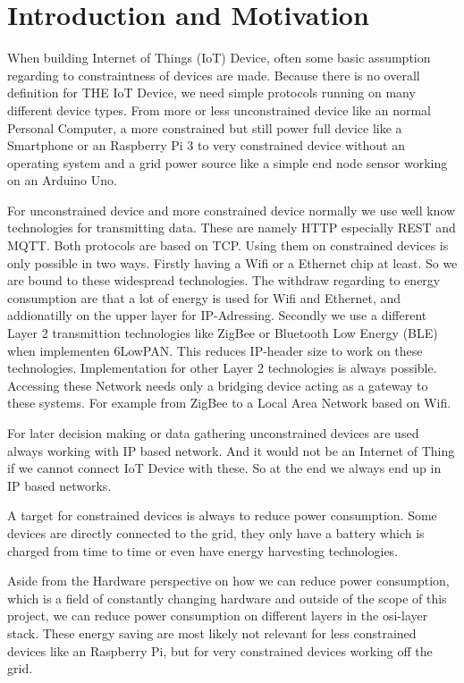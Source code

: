 \section{Introduction and Motivation}\label{sec:ein}
When building Internet of Things (IoT) Device, often some basic assumption regarding to constraintness of devices are made.
Because there is no overall definition for THE IoT Device, we need simple protocols running on many different device types.
From more or less unconstrained device like an normal Personal Computer, a more constrained but still power full device like a Smartphone or an Raspberry Pi 3 to very constrained device without an operating system and a grid power source like a simple end node sensor working on an Arduino Uno.

For unconstrained device and more constrained device normally we use well know technologies for transmitting data.
These are namely HTTP especially REST and MQTT.
Both protocols are based on TCP.
Using them on constrained devices is only possible in two ways.
Firstly having a Wifi or a Ethernet chip at least. So we are bound to these widespread technologies.
The withdraw regarding to energy consumption are that a lot of energy is used for Wifi and Ethernet, and addionatilly on the upper layer for IP-Adressing.
Secondly we use a different Layer 2 transmittion technologies like ZigBee or Bluetooth Low Energy (BLE) when implementen 6LowPAN.
This reduces IP-header size to work on these technologies.
Implementation for other Layer 2 technologies is always possible.
Accessing these Network needs only a bridging device acting as a gateway to these systems. For example from ZigBee to a Local Area Network based on Wifi.

For later decision making or data gathering unconstrained devices are used always working with IP based network. And it would not be an Internet of Thing if we cannot connect IoT Device with these.
So at the end we always end up in IP based networks.

A target for constrained devices is always to reduce power consumption.
Some devices are directly connected to the grid, they only have a battery which is charged from time to time or even have energy harvesting technologies.

Aside from the Hardware perspective on how we can reduce power consumption, which is a field of constantly changing hardware and outside of the scope of this project, we can reduce power consumption on different layers in the osi-layer stack. These energy saving are most likely not relevant for less constrained devices like an Raspberry Pi, but for very constrained devices working off the grid.


